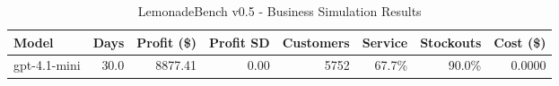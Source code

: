 \begin{table}[h]
\centering
\caption{LemonadeBench v0.5 - Business Simulation Results}
\label{tab:lemonadebench_v05}
\begin{tabular}{|l|r|r|r|r|r|r|r|}
\hline
\textbf{Model} & \textbf{Days} & \textbf{Profit (\$)} & \textbf{Profit SD} & \textbf{Customers} & \textbf{Service} & \textbf{Stockouts} & \textbf{Cost (\$)} \\
\hline
gpt-4.1-mini    & 30.0 &  8877.41 &    0.00 &      5752 &    67.7\% &      90.0\% & 0.0000 \\
\hline
\end{tabular}
\end{table}